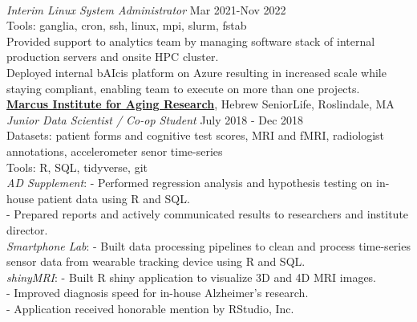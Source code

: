 \documentclass[a4paper]{article}
\newcommand{\mybullet}{
	\indent 
  \textbullet \hspace*{2mm}
}
\begin{document}
  \\
  \textit{Interim Linux System Administrator} \hfill Mar 2021-Nov 2022 \\ Tools: ganglia, cron, ssh, linux, mpi, slurm, fstab  \\
  \mybullet Provided support to analytics team by managing software stack of internal production servers and onsite HPC cluster. \\
  \mybullet Deployed internal bAIcis platform on Azure resulting in increased scale while staying compliant, enabling team to execute \hspace*{10mm}on more than one projects. \\

  \noindent
  \textbf{\href{https://www.marcusinstituteforaging.org/}{Marcus Institute for Aging Research}}, 
  Hebrew SeniorLife, Roslindale, MA \\
        \textit{Junior Data Scientist / Co-op Student} \hfill July 2018 - Dec 2018 \\
        Datasets: patient forms and cognitive test scores, MRI and fMRI, radiologist annotations, accelerometer senor time-series \\
        Tools: R, SQL, tidyverse, git \\
        \mybullet \textit{AD Supplement}: 
        \hspace*{3.7 mm} - Performed regression analysis and hypothesis testing
        on in-house patient data using R and SQL. \\
        \hspace*{37.5 mm} - Prepared reports and actively communicated results to researchers and institute director.  \\
        \mybullet \textit{Smartphone Lab}: 
        \hspace* {2.3 mm} - Built data processing pipelines to clean and process time-series sensor data from wearable tracking \hspace*{40mm}device using R and SQL. \\
        \mybullet \textit{shinyMRI}: 
        \hspace* {12.7 mm} - Built R shiny application to visualize 3D and 4D MRI images. \\
        \hspace*{37.5 mm} - Improved diagnosis speed for in-house Alzheimer's research. \\
        \hspace*{37.5 mm} - Application received honorable mention by RStudio, Inc. \\
        
\end{document}
